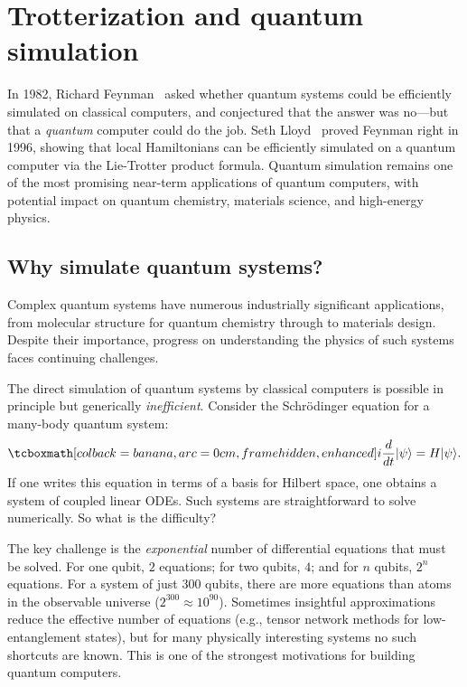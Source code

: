 
\section{Trotterization and quantum simulation}\label{sec:simulation}

\begin{historical}
  In 1982, Richard Feynman~\cite{Feynman1982} asked whether quantum systems
  could be efficiently simulated on classical computers, and conjectured that
  the answer was no---but that a \emph{quantum} computer could do the job.
  Seth Lloyd~\cite{Lloyd1996} proved Feynman right in 1996, showing that
  local Hamiltonians can be efficiently simulated on a quantum computer via
  the Lie-Trotter product formula.  Quantum simulation remains one of the
  most promising near-term applications of quantum computers, with potential
  impact on quantum chemistry, materials science, and high-energy physics.
\end{historical}

\subsection{Why simulate quantum systems?}\label{subsec:why-simulate}

Complex quantum systems have numerous industrially significant applications,
from molecular structure for quantum chemistry through to materials design.
Despite their importance, progress on understanding the physics of such
systems faces continuing challenges.

The direct simulation of quantum systems by classical computers is possible
in principle but generically \emph{inefficient}.  Consider the Schrödinger
equation for a many-body quantum system:
\begin{equation}\label{eq:schrodinger}
  \eqbox{i\frac{d}{dt}\ket{\psi} = H \ket{\psi}.}
\end{equation}
If one writes this equation in terms of a basis for Hilbert space, one
obtains a system of coupled linear ODEs.  Such systems are straightforward
to solve numerically.  So what is the difficulty?

\begin{intuition}
  The key challenge is the \emph{exponential} number of differential
  equations that must be solved.  For one qubit, $2$ equations; for two
  qubits, $4$; and for $n$ qubits, $2^n$ equations.  For a system of just
  $300$ qubits, there are more equations than atoms in the observable
  universe ($2^{300} \approx 10^{90}$).  Sometimes insightful approximations
  reduce the effective number of equations (e.g., tensor network methods for
  low-entanglement states), but for many physically interesting systems no
  such shortcuts are known.  This is one of the strongest motivations for
  building quantum computers.
\end{intuition}

